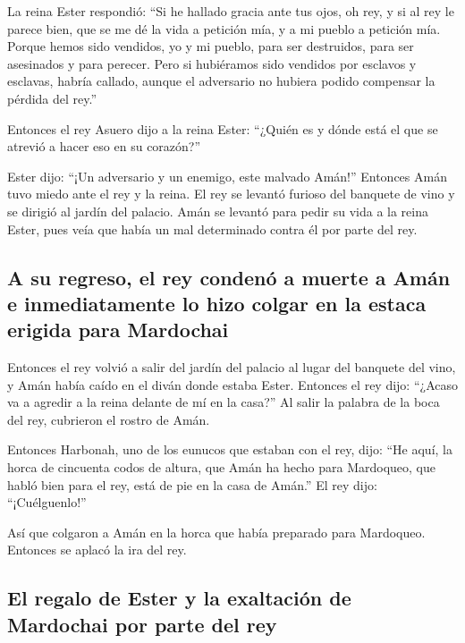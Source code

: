  La reina Ester respondió: ``Si he hallado gracia ante tus
ojos, oh rey, y si al rey le parece bien, que se me dé la vida a
petición mía, y a mi pueblo a petición mía.  Porque hemos
sido vendidos, yo y mi pueblo, para ser destruidos, para ser asesinados
y para perecer. Pero si hubiéramos sido vendidos por esclavos y
esclavas, habría callado, aunque el adversario no hubiera podido
compensar la pérdida del rey.''

 Entonces el rey Asuero dijo a la reina Ester: ``¿Quién es
y dónde está el que se atrevió a hacer eso en su corazón?''

 Ester dijo: ``¡Un adversario y un enemigo, este malvado
Amán!'' Entonces Amán tuvo miedo ante el rey y la reina. 
El rey se levantó furioso del banquete de vino y se dirigió al jardín
del palacio. Amán se levantó para pedir su vida a la reina Ester, pues
veía que había un mal determinado contra él por parte del rey.

\hypertarget{a-su-regreso-el-rey-condenuxf3-a-muerte-a-amuxe1n-e-inmediatamente-lo-hizo-colgar-en-la-estaca-erigida-para-mardochai}{%
\subsection{A su regreso, el rey condenó a muerte a Amán e
inmediatamente lo hizo colgar en la estaca erigida para
Mardochai}\label{a-su-regreso-el-rey-condenuxf3-a-muerte-a-amuxe1n-e-inmediatamente-lo-hizo-colgar-en-la-estaca-erigida-para-mardochai}}

 Entonces el rey volvió a salir del jardín del palacio al
lugar del banquete del vino, y Amán había caído en el diván donde estaba
Ester. Entonces el rey dijo: ``¿Acaso va a agredir a la reina delante de
mí en la casa?'' Al salir la palabra de la boca del rey, cubrieron el
rostro de Amán.

 Entonces Harbonah, uno de los eunucos que estaban con el
rey, dijo: ``He aquí, la horca de cincuenta codos de altura, que Amán ha
hecho para Mardoqueo, que habló bien para el rey, está de pie en la casa
de Amán.'' El rey dijo: ``¡Cuélguenlo!''

 Así que colgaron a Amán en la horca que había preparado
para Mardoqueo. Entonces se aplacó la ira del rey.

\hypertarget{el-regalo-de-ester-y-la-exaltaciuxf3n-de-mardochai-por-parte-del-rey}{%
\subsection{El regalo de Ester y la exaltación de Mardochai por parte
del
rey}\label{el-regalo-de-ester-y-la-exaltaciuxf3n-de-mardochai-por-parte-del-rey}}

